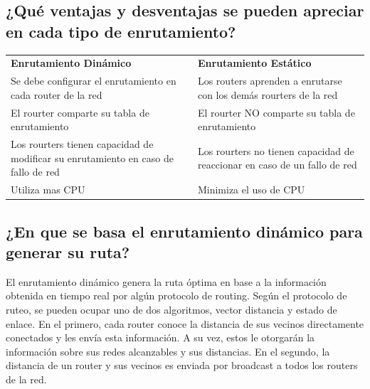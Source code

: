\documentclass[spanish]{udpreport}
\begin{document}
\subsection{¿Qué ventajas y desventajas se pueden apreciar en cada tipo de enrutamiento?}
\begin{table}[H]
\centering
\begin{tabular}{p{8cm}|p{8cm}}
\textbf{Enrutamiento Dinámico} & \textbf{Enrutamiento Estático} \\
     Se debe configurar el enrutamiento en cada router de la red &
     Los routers aprenden a enrutarse con los demás rourters de la red \\
     El rourter comparte su tabla de enrutamiento  & 
     El rourter NO comparte su tabla de enrutamiento  \\
     Los rourters tienen capacidad de modificar su enrutamiento en caso de fallo de red &
     Los rourters no tienen capacidad de reaccionar en caso de un fallo de red \\
     Utiliza mas CPU & 
     Minimiza el uso de CPU \\    
\end{tabular}
\end{table}

\subsection{¿En que se basa el enrutamiento dinámico para generar su ruta?}
El enrutamiento dinámico genera la ruta óptima en base a la información obtenida en tiempo real por algún protocolo de routing. Según el protocolo de ruteo, se pueden ocupar uno de dos algoritmos, vector distancia y estado de enlace. En el primero, cada router conoce la distancia de sus vecinos directamente conectados y les envía esta información. A su vez, estos le otorgarán la información sobre sus redes alcanzables y sus distancias. En el segundo, la distancia de un router y sus vecinos es enviada por broadcast a todos los routers de la red.



\listoffigures
\end{document}
